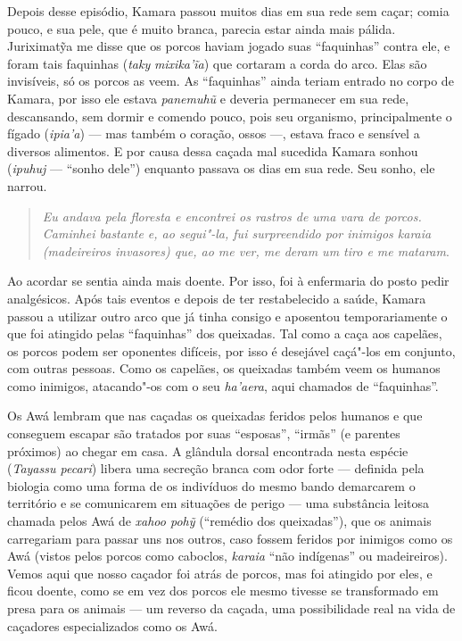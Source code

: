 Depois desse episódio, Kamara passou muitos dias em sua rede sem caçar;
comia pouco, e sua pele, que é muito branca, parecia estar ainda mais
pálida. Juriximatỹa me disse que os porcos haviam jogado suas
``faquinhas'' contra ele, e foram tais faquinhas (\emph{taky}
\emph{mixika'ĩa}) que cortaram a corda do arco. Elas são invisíveis, só
os porcos as veem. As ``faquinhas'' ainda teriam entrado no corpo de
Kamara, por isso ele estava \emph{panemuhũ} e deveria permanecer em sua
rede, descansando, sem dormir e comendo pouco, pois seu organismo,
principalmente o fígado (\emph{ipia'a}) --- mas também o coração, ossos ---,
estava fraco e sensível a diversos alimentos. E por causa dessa caçada
mal sucedida Kamara sonhou (\emph{ipuhuj} --- ``sonho dele'') enquanto
passava os dias em sua rede. Seu sonho, ele narrou.

\begin{quote}
\emph{Eu andava pela floresta e encontrei os rastros de uma vara de porcos.
Caminhei bastante e, ao segui"-la, fui surpreendido por inimigos
\emph{karaia} (madeireiros invasores) que, ao me ver, me deram um tiro e
me mataram}.
\end{quote}

Ao acordar se sentia ainda mais doente. Por isso, foi à enfermaria do
posto pedir analgésicos. Após tais eventos e depois de ter restabelecido
a saúde, Kamara passou a utilizar outro arco que já tinha consigo e
aposentou temporariamente o que foi atingido pelas ``faquinhas'' dos
queixadas. Tal como a caça aos capelães, os porcos podem ser oponentes
difíceis, por isso é desejável caçá"-los em conjunto, com outras pessoas.
Como os capelães, os queixadas também veem os humanos como inimigos,
atacando"-os com o seu \emph{ha'aera}, aqui chamados de ``faquinhas''.

Os Awá lembram que nas caçadas os queixadas feridos pelos humanos e que
conseguem escapar são tratados por suas ``esposas'', ``irmãs'' (e
parentes próximos) ao chegar em casa. A glândula dorsal encontrada nesta
espécie (\emph{Tayassu pecari}) libera uma secreção branca com odor
forte --- definida pela biologia como uma forma de os indivíduos do mesmo
bando demarcarem o território e se comunicarem em situações de perigo ---
uma substância leitosa chamada pelos Awá de \emph{xahoo pohỹ} (``remédio
dos queixadas''), que os animais carregariam para passar uns nos outros,
caso fossem feridos por inimigos como os Awá (vistos pelos porcos como
caboclos, \emph{karaia} ``não indígenas'' ou madeireiros). Vemos aqui
que nosso caçador foi atrás de porcos, mas foi atingido por eles, e
ficou doente, como se em vez dos porcos ele mesmo tivesse se
transformado em presa para os animais --- um reverso da caçada, uma
possibilidade real na vida de caçadores especializados como os Awá.

